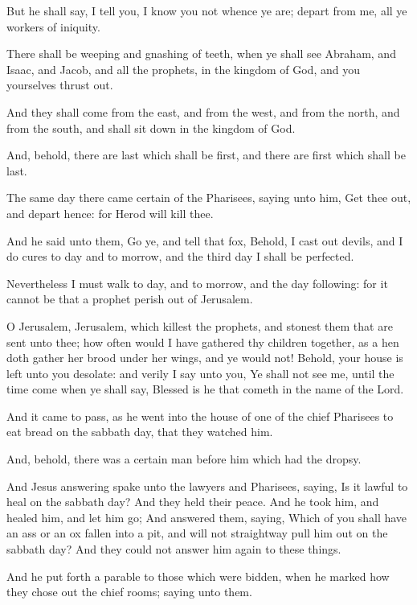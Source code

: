 \Verse But he shall say, I tell you, I know you not whence ye are; depart from me, all ye workers of iniquity.

\Verse There shall be weeping and gnashing of teeth, when ye shall see Abraham, and Isaac, and Jacob, and all the prophets, in the kingdom of God, and you yourselves thrust out.

\Verse And they shall come from the east, and from the west, and from the north, and from the south, and shall sit down in the kingdom of God.

\Verse And, behold, there are last which shall be first, and there are first which shall be last.

\Verse The same day there came certain of the Pharisees, saying unto him, Get thee out, and depart hence: for Herod will kill thee.

\Verse And he said unto them, Go ye, and tell that fox, Behold, I cast out devils, and I do cures to day and to morrow, and the third day I shall be perfected.

\Verse Nevertheless I must walk to day, and to morrow, and the day following: for it cannot be that a prophet perish out of Jerusalem.

\Verse O Jerusalem, Jerusalem, which killest the prophets, and stonest them that are sent unto thee; how often would I have gathered thy children together, as a hen doth gather her brood under her wings, and ye would not!  \Verse Behold, your house is left unto you desolate: and verily I say unto you, Ye shall not see me, until the time come when ye shall say, Blessed is he that cometh in the name of the Lord.


\Chapter
\Verse And it came to pass, as he went into the house of one of the chief Pharisees to eat bread on the sabbath day, that they watched him.

\Verse And, behold, there was a certain man before him which had the dropsy.

\Verse And Jesus answering spake unto the lawyers and Pharisees, saying, Is it lawful to heal on the sabbath day?  \Verse And they held their peace. And he took him, and healed him, and let him go; \Verse And answered them, saying, Which of you shall have an ass or an ox fallen into a pit, and will not straightway pull him out on the sabbath day?  \Verse And they could not answer him again to these things.

\Verse And he put forth a parable to those which were bidden, when he marked how they chose out the chief rooms; saying unto them.

